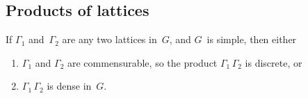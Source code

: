 \subsection{Products of lattices}

\begin{cor} \label{ProdLattsDense}
If\/ $\Gamma_1$ and\/~$\Gamma_2$ are any two lattices in~$G$, and $G$~is simple, then either
	\begin{enumerate}
	\item $\Gamma_1$ and\/ $\Gamma_2$ are commensurable, so the product\/ $\Gamma_1 \, \Gamma_2$ is discrete,
	or
	\item $\Gamma_1 \, \Gamma_2$ is dense in~$G$.
	\end{enumerate}
\end{cor}



